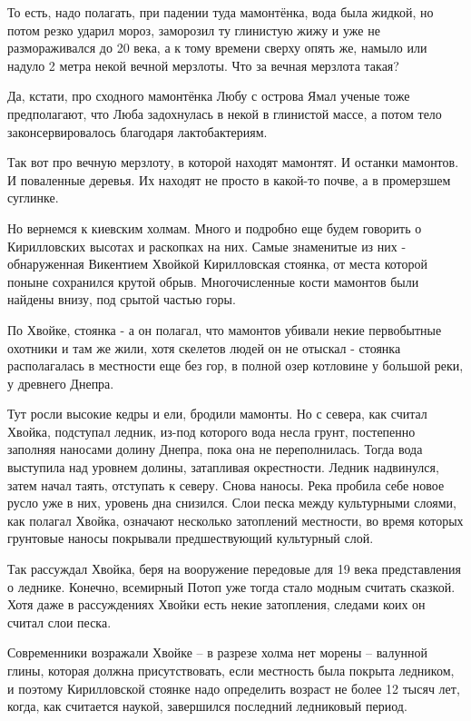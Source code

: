    То есть, надо полагать, при падении туда мамонтёнка, вода была жидкой, но потом резко ударил мороз, заморозил ту глинистую жижу и уже не размораживался до 20 века, а к тому времени сверху опять же, намыло или надуло 2 метра некой вечной мерзлоты. Что за вечная мерзлота такая? 

   Да, кстати, про сходного мамонтёнка Любу с острова Ямал ученые тоже предполагают, что Люба задохнулась в некой в глинистой массе, а потом тело законсервировалось благодаря лактобактериям.

   Так вот про вечную мерзлоту, в которой находят мамонтят. И останки мамонтов. И поваленные деревья. Их находят не просто в какой-то почве, а в промерзшем суглинке.

   Но вернемся к киевским холмам. Много и подробно еще будем говорить о Кирилловских высотах и раскопках на них. Самые знаменитые из них - обнаруженная Викентием Хвойкой Кирилловская стоянка, от места которой поныне сохранился крутой обрыв.
    Многочисленные кости мамонтов были найдены внизу, под срытой частью горы. 
   
   По Хвойке, стоянка - а он полагал, что мамонтов убивали некие первобытные охотники и там же жили, хотя скелетов людей он не отыскал - стоянка располагалась в местности еще без гор, в полной озер котловине у большой реки, у древнего Днепра.   

Тут росли высокие кедры и ели, бродили мамонты. Но с севера, как считал Хвойка, подступал ледник, из-под которого вода несла грунт, постепенно заполняя наносами долину Днепра, пока она не переполнилась. Тогда вода выступила над уровнем долины, затапливая окрестности. Ледник надвинулся, затем начал таять, отступать к северу. Снова наносы. Река пробила себе новое русло уже в них, уровень дна снизился. Слои песка между культурными слоями, как полагал Хвойка, означают несколько затоплений местности, во время которых грунтовые наносы покрывали предшествующий культурный слой. 

   Так рассуждал Хвойка, беря на вооружение передовые для 19 века представления о леднике. Конечно, всемирный Потоп уже тогда стало модным считать сказкой. Хотя даже в рассуждениях Хвойки есть некие затопления, следами коих он считал слои песка.

   Современники возражали Хвойке –  в разрезе холма нет морены – валунной глины, которая должна присутствовать, если местность была покрыта ледником, и поэтому Кирилловской стоянке надо определить возраст не более 12 тысяч лет, когда, как считается наукой, завершился последний ледниковый период.

